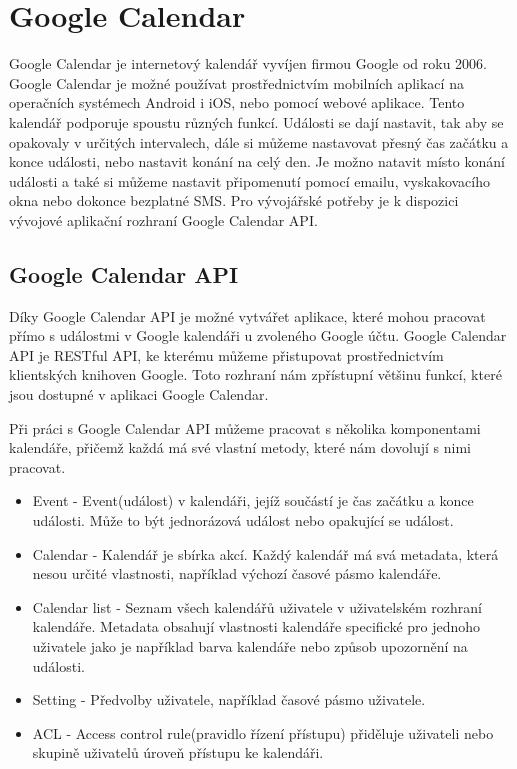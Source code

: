 \section{Google Calendar}

Google Calendar je internetový kalendář vyvíjen firmou Google od roku 2006. Google Calendar je možné používat prostřednictvím mobilních aplikací na operačních systémech Android i iOS, nebo pomocí webové aplikace. Tento kalendář podporuje spoustu různých funkcí. Události se dají nastavit, tak aby se opakovaly v určitých intervalech, dále si můžeme  nastavovat přesný čas začátku a konce události, nebo nastavit konání na celý den. Je možno natavit místo konání události a také si můžeme nastavit připomenutí pomocí emailu, vyskakovacího okna nebo dokonce bezplatné SMS. Pro vývojářské potřeby je k dispozici vývojové aplikační rozhraní Google Calendar API.

\subsection{Google Calendar API}

Díky Google Calendar API je možné vytvářet aplikace, které mohou pracovat přímo s událostmi v Google kalendáři u zvoleného Google účtu. Google Calendar API je RESTful API, ke kterému můžeme přistupovat prostřednictvím klientských knihoven Google. Toto rozhraní nám zpřístupní většinu funkcí, které jsou dostupné v aplikaci Google Calendar. \cite{calendarapi}

Při práci s Google Calendar API můžeme pracovat s několika komponentami kalendáře, přičemž každá má své vlastní metody, které nám dovolují s nimi pracovat. \cite{calendarapi}

\begin{itemize}
  \item{Event - Event(událost) v kalendáři, jejíž součástí je čas začátku a konce události. Může to být jednorázová událost nebo opakující se událost. }
  \item{Calendar - Kalendář je sbírka akcí. Každý kalendář má svá metadata, která nesou určité vlastnosti, například výchozí časové pásmo kalendáře. }
  \item{Calendar list - Seznam všech kalendářů uživatele v uživatelském rozhraní kalendáře. Metadata obsahují vlastnosti kalendáře specifické pro jednoho uživatele jako je například barva kalendáře nebo způsob upozornění na události.}
  \item{Setting - Předvolby uživatele, například časové pásmo uživatele.}
  \item{ACL - Access control rule(pravidlo řízení přístupu) přiděluje uživateli nebo skupině uživatelů úroveň přístupu ke kalendáři.}
\end{itemize}

